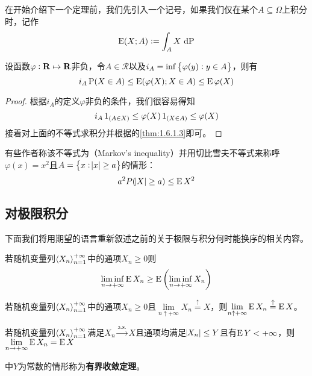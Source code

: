 \documentclass[../main.tex]{subfiles}
\begin{document}
在开始介绍下一个定理前，我们先引入一个记号，如果我们仅在某个\(A\subseteq \Omega\)上积分时，记作
\[\E(X;A):=\int_AX\,\dif\probP\]
\begin{theorem} \label{thm:1.6.4}
	设函数\(\varphi:\mathbf{R}\mapsto\mathbf{R}\)非负，令\(A\in\mathcal{R}\)以及\(i_A=\inf\cbr{\varphi(y):y\in A}\)，则有
	\[i_A\operatorname{\mathrm{P}}(X\in A)\leq\operatorname{E}(\varphi(X);X\in A)\leq\operatorname{E}\varphi(X)\]
\end{theorem}
\begin{proof}
	根据\(i_A\)的定义\(\varphi\)非负的条件，我们很容易得知
	\[i_A\operatorname{1}_{(A\in X)}\leq\varphi(X)\operatorname{1}_{(X\in A)}\leq\varphi(X)\]
	接着对上面的不等式求积分并根据的\ref{thm:1.6.1.3}即可。
\end{proof}
\begin{remark}
	有些作者称该不等式为（Markov's inequality）并用切比雪夫不等式来称呼\(\varphi(x)=x^2\)且\(A=\cbr{x:\envert{x}\geq a}\)的情形：
	\begin{equation}
		a^2P(\envert{X}\geq a)\leq \E X^2
	\end{equation}
\end{remark}

\subsection{对极限积分}
下面我们将用期望的语言重新叙述之前的关于极限与积分何时能换序的相关内容。
\begin{theorem}
若随机变量列\(\left<X_n\right>^{+\infty}_{n=1}\)中的通项\(X_n\geq0\)则
\[\liminf_{n\rightarrow+\infty}\E X_n\geq\E\del{\liminf_{n\rightarrow+\infty}X_n}\]
\end{theorem}
\begin{theorem}
	若随机变量列\(\left<X_n\right>^{+\infty}_{n=1}\)中的通项\(X_n\geq0\)且\(\lim\limits_{n\uparrow+\infty}X_n\stackrel{\uparrow}{=}X\)，则\(\lim\limits_{n\uparrow+\infty}\operatorname{E} X_n\stackrel{\uparrow}{=}\operatorname{E} X\)。
\end{theorem}
\begin{theorem}\label{thm:1.6.7}
	若随机变量列\(\left<X_n\right>^{+\infty}_{n=1}\)满足\(X_n\xrightarrow{\text{a.s.}}X\)且通项均满足\(\envert{X_n}\leq Y\)且有\(\operatorname{E} Y<+\infty\)，则\(\lim\limits_{n\rightarrow+\infty}\operatorname{E} X_n=\operatorname{E} X\)
\end{theorem}
中\(Y\)为常数的情形称为\textbf{有界收敛定理}。
\end{document}
